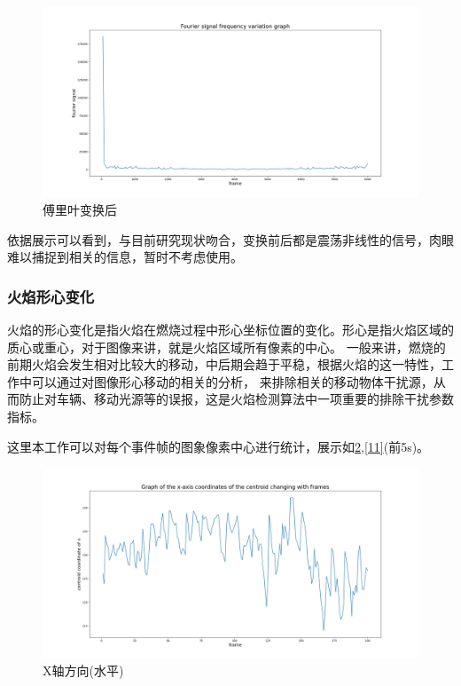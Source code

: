     \begin{figure}[ht]
        \centering
        \includegraphics[width=\textwidth]{figures/extract_flicker_02.png}
        \caption{傅里叶变换后}
        \label{9}
    \end{figure}
    

依据展示可以看到，与目前研究现状吻合，变换前后都是震荡非线性的信号，肉眼难以捕捉到相关的信息，暂时不考虑使用。

\subsubsection{火焰形心变化}
火焰的形心变化是指火焰在燃烧过程中形心坐标位置的变化。形心是指火焰区域的质心或重心，对于图像来讲，就是火焰区域所有像素的中心。
一般来讲，燃烧的前期火焰会发生相对比较大的移动，中后期会趋于平稳，根据火焰的这一特性，工作中可以通过对图像形心移动的相关的分析，
来排除相关的移动物体干扰源，从而防止对车辆、移动光源等的误报，这是火焰检测算法中一项重要的排除干扰参数指标。

这里本工作可以对每个事件帧的图象像素中心进行统计，展示如\ref{10},\ref{11}(前5s)。
\begin{figure}[ht]
    \centering
    \includegraphics[width=\textwidth]{figures/extract_centroid_x.png}
    \caption{X轴方向(水平)}
    \label{10}
    \end{figure}

